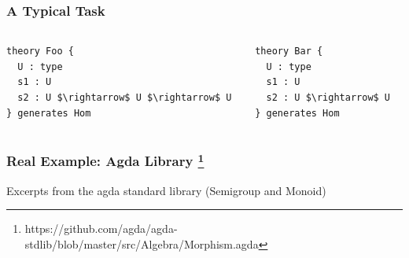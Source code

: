\documentclass[t,12pt,numbers,fleqn,usenames,xcolor=dvipsnames]{beamer}
\begin{document}
\begin{frame}[fragile]
\frametitle{A Typical Task}
\begin{columns}
\begin{column}{0.45\textwidth}
	\begin{lstlisting}
theory Foo { 
  U : type 
  s1 : U 
  s2 : U $\rightarrow$ U $\rightarrow$ U
} generates Hom 
	\end{lstlisting}
\end{column}
\begin{column}{0.45\textwidth}
	\begin{lstlisting}
theory Bar {
  U : type 
  s1 : U 
  s2 : U $\rightarrow$ U 
} generates Hom 
	\end{lstlisting}
\end{column}
\end{columns}
\end{frame}

		


\begin{frame}
\frametitle{Real Example: Agda Library
\footnote{https://github.com/agda/agda-stdlib/blob/master/src/Algebra/Morphism.agda}}
Excerpts from the agda standard library (Semigroup and Monoid) 
\end{frame}
\end{document}
